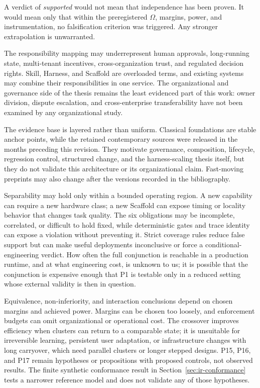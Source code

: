 A verdict of \textit{supported} would not mean that independence has been proven. It would mean only that within the preregistered $\Omega$, margins, power, and instrumentation, no falsification criterion was triggered. Any stronger extrapolation is unwarranted.

The responsibility mapping may underrepresent human approvals, long-running state, multi-tenant incentives, cross-organization trust, and regulated decision rights. Skill, Harness, and Scaffold are overloaded terms, and existing systems may combine their responsibilities in one service. The organizational and governance side of the thesis remains the least evidenced part of this work: owner division, dispute escalation, and cross-enterprise transferability have not been examined by any organizational study.

The evidence base is layered rather than uniform. Classical foundations are stable anchor points, while the retained contemporary sources were released in the months preceding this revision. They motivate governance, composition, lifecycle, regression control, structured change, and the harness-scaling thesis itself, but they do not validate this architecture or its organizational claim. Fast-moving preprints may also change after the versions recorded in the bibliography.

Separability may hold only within a bounded operating region. A new capability can require a new hardware class; a new Scaffold can expose timing or locality behavior that changes task quality. The six obligations may be incomplete, correlated, or difficult to hold fixed, while deterministic gates and trace identity can expose a violation without preventing it. Strict coverage rules reduce false support but can make useful deployments inconclusive or force a conditional-engineering verdict. How often the full conjunction is reachable in a production runtime, and at what engineering cost, is unknown to us; it is possible that the conjunction is expensive enough that P1 is testable only in a reduced setting whose external validity is then in question.

Equivalence, non-inferiority, and interaction conclusions depend on chosen margins and achieved power. Margins can be chosen too loosely, and enforcement budgets can omit organizational or operational cost. The crossover improves efficiency when clusters can return to a comparable state; it is unsuitable for irreversible learning, persistent user adaptation, or infrastructure changes with long carryover, which need parallel clusters or longer stepped designs. P15, P16, and P17 remain hypotheses or propositions with proposed controls, not observed results. The finite synthetic conformance result in Section~\ref{sec:ir-conformance} tests a narrower reference model and does not validate any of those hypotheses.

